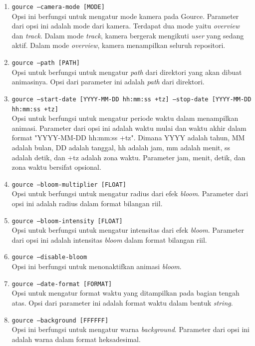 \documentclass[a4paper,twoside]{article}
\begin{document}
\begin{enumerate}
\begin{enumerate}
\item \texttt{gource --camera-mode [MODE]}\\
Opsi ini berfungsi untuk mengatur mode kamera pada Gource. Parameter dari opsi ini adalah mode dari kamera. Terdapat dua mode yaitu \textit{overview} dan \textit{track}. Dalam mode \textit{track}, kamera bergerak mengikuti \textit{user} yang sedang aktif. Dalam mode \textit{overview}, kamera menampilkan seluruh repositori.

\item \texttt{gource --path [PATH]}\\
Opsi untuk berfungsi untuk mengatur \textit{path} dari direktori yang akan dibuat animasinya. Opsi dari parameter ini adalah \textit{path} dari direktori.

\item \texttt{gource --start-date [YYYY-MM-DD hh:mm:ss +tz] --stop-date [YYYY-MM-DD hh:mm:ss +tz]}\\
Opsi untuk berfungsi untuk mengatur periode waktu dalam menampilkan animasi. Parameter dari opsi ini adalah waktu mulai dan waktu akhir dalam format "YYYY-MM-DD hh:mm:ss +tz". Dimana YYYY adalah tahun, MM adalah bulan, DD adalah tanggal, hh adalah jam, mm adalah menit, ss adalah detik, dan +tz adalah zona waktu. Parameter jam, menit, detik, dan zona waktu bersifat opsional.    

\item \texttt{gource --bloom-multiplier [FLOAT] }\\
Opsi untuk berfungsi untuk mengatur radius dari efek \textit{bloom}. Parameter dari opsi ini adalah radius dalam format bilangan riil.

\item \texttt{gource --bloom-intensity [FLOAT]}\\
Opsi untuk berfungsi untuk mengatur intensitas dari efek \textit{bloom}. Parameter dari opsi ini adalah intensitas \textit{bloom} dalam format bilangan riil.

\item \texttt{gource --disable-bloom}\\
Opsi ini berfungsi untuk menonaktifkan animasi \textit{bloom}.

\item \texttt{gource --date-format [FORMAT]}\\ 
Opsi untuk mengatur format waktu yang ditampilkan pada bagian tengah atas. Opsi dari parameter ini adalah format waktu dalam bentuk \textit{string}.

\item \texttt{gource --background [FFFFFF]}\\
Opsi ini berfungsi untuk mengatur warna \textit{background}. Parameter dari opsi ini adalah warna dalam format heksadesimal.


\end{enumerate}
\end{enumerate}
\end{document}

